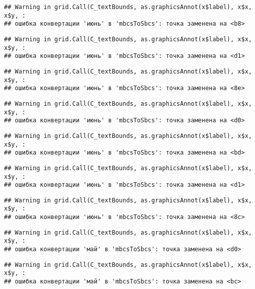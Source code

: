 \documentclass[
]{article}
\begin{document}
\begin{verbatim}
## Warning in grid.Call(C_textBounds, as.graphicsAnnot(x$label), x$x, x$y, :
## ошибка конвертации 'июнь' в 'mbcsToSbcs': точка заменена на <b8>
\end{verbatim}

\begin{verbatim}
## Warning in grid.Call(C_textBounds, as.graphicsAnnot(x$label), x$x, x$y, :
## ошибка конвертации 'июнь' в 'mbcsToSbcs': точка заменена на <d1>
\end{verbatim}

\begin{verbatim}
## Warning in grid.Call(C_textBounds, as.graphicsAnnot(x$label), x$x, x$y, :
## ошибка конвертации 'июнь' в 'mbcsToSbcs': точка заменена на <8e>
\end{verbatim}

\begin{verbatim}
## Warning in grid.Call(C_textBounds, as.graphicsAnnot(x$label), x$x, x$y, :
## ошибка конвертации 'июнь' в 'mbcsToSbcs': точка заменена на <d0>
\end{verbatim}

\begin{verbatim}
## Warning in grid.Call(C_textBounds, as.graphicsAnnot(x$label), x$x, x$y, :
## ошибка конвертации 'июнь' в 'mbcsToSbcs': точка заменена на <bd>
\end{verbatim}

\begin{verbatim}
## Warning in grid.Call(C_textBounds, as.graphicsAnnot(x$label), x$x, x$y, :
## ошибка конвертации 'июнь' в 'mbcsToSbcs': точка заменена на <d1>
\end{verbatim}

\begin{verbatim}
## Warning in grid.Call(C_textBounds, as.graphicsAnnot(x$label), x$x, x$y, :
## ошибка конвертации 'июнь' в 'mbcsToSbcs': точка заменена на <8c>
\end{verbatim}

\begin{verbatim}
## Warning in grid.Call(C_textBounds, as.graphicsAnnot(x$label), x$x, x$y, :
## ошибка конвертации 'май' в 'mbcsToSbcs': точка заменена на <d0>
\end{verbatim}

\begin{verbatim}
## Warning in grid.Call(C_textBounds, as.graphicsAnnot(x$label), x$x, x$y, :
## ошибка конвертации 'май' в 'mbcsToSbcs': точка заменена на <bc>
\end{verbatim}
\end{document}
